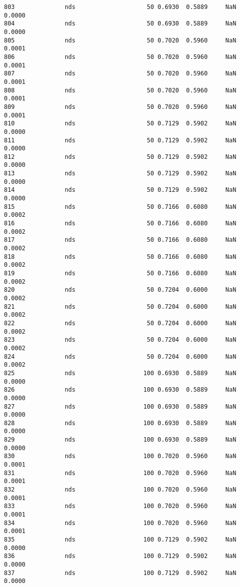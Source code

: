 \documentclass[11pt]{article}
\begin{document}
\begin{Verbatim}[commandchars=\\\{\}]
803              nds                    50 0.6930  0.5889     NaN 0.0000   
804              nds                    50 0.6930  0.5889     NaN 0.0000   
805              nds                    50 0.7020  0.5960     NaN 0.0001   
806              nds                    50 0.7020  0.5960     NaN 0.0001   
807              nds                    50 0.7020  0.5960     NaN 0.0001   
808              nds                    50 0.7020  0.5960     NaN 0.0001   
809              nds                    50 0.7020  0.5960     NaN 0.0001   
810              nds                    50 0.7129  0.5902     NaN 0.0000   
811              nds                    50 0.7129  0.5902     NaN 0.0000   
812              nds                    50 0.7129  0.5902     NaN 0.0000   
813              nds                    50 0.7129  0.5902     NaN 0.0000   
814              nds                    50 0.7129  0.5902     NaN 0.0000   
815              nds                    50 0.7166  0.6080     NaN 0.0002   
816              nds                    50 0.7166  0.6080     NaN 0.0002   
817              nds                    50 0.7166  0.6080     NaN 0.0002   
818              nds                    50 0.7166  0.6080     NaN 0.0002   
819              nds                    50 0.7166  0.6080     NaN 0.0002   
820              nds                    50 0.7204  0.6000     NaN 0.0002   
821              nds                    50 0.7204  0.6000     NaN 0.0002   
822              nds                    50 0.7204  0.6000     NaN 0.0002   
823              nds                    50 0.7204  0.6000     NaN 0.0002   
824              nds                    50 0.7204  0.6000     NaN 0.0002   
825              nds                   100 0.6930  0.5889     NaN 0.0000   
826              nds                   100 0.6930  0.5889     NaN 0.0000   
827              nds                   100 0.6930  0.5889     NaN 0.0000   
828              nds                   100 0.6930  0.5889     NaN 0.0000   
829              nds                   100 0.6930  0.5889     NaN 0.0000   
830              nds                   100 0.7020  0.5960     NaN 0.0001   
831              nds                   100 0.7020  0.5960     NaN 0.0001   
832              nds                   100 0.7020  0.5960     NaN 0.0001   
833              nds                   100 0.7020  0.5960     NaN 0.0001   
834              nds                   100 0.7020  0.5960     NaN 0.0001   
835              nds                   100 0.7129  0.5902     NaN 0.0000   
836              nds                   100 0.7129  0.5902     NaN 0.0000   
837              nds                   100 0.7129  0.5902     NaN 0.0000   

\end{Verbatim}
\end{document}
